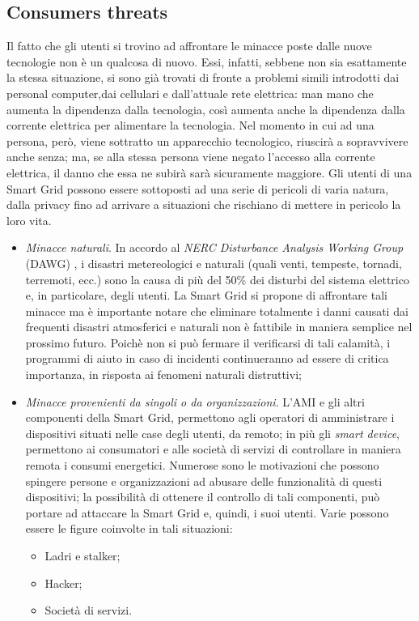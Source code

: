 \subsection{Consumers threats}
Il fatto che gli utenti si trovino ad affrontare le minacce poste dalle nuove tecnologie non è un qualcosa di nuovo. Essi, infatti, sebbene non sia esattamente la stessa situazione, si sono già trovati di fronte a problemi simili introdotti dai personal computer,dai  cellulari e dall'attuale rete elettrica: man mano che aumenta la dipendenza dalla tecnologia, così aumenta anche la dipendenza dalla corrente elettrica per alimentare la tecnologia. Nel momento in cui ad una persona, però, viene sottratto un apparecchio tecnologico, riuscirà a sopravvivere anche senza; ma, se alla stessa persona viene negato l'accesso alla corrente elettrica, il danno che essa ne subirà sarà sicuramente maggiore.\newline
Gli utenti di una Smart Grid possono essere sottoposti ad una serie di pericoli di varia natura, dalla privacy fino ad arrivare a situazioni che rischiano di mettere in pericolo la loro vita.
\begin{itemize}
\item \textit{Minacce naturali}. In accordo al \textit{NERC Disturbance Analysis Working Group} (DAWG) \cite{securingSG}, i disastri metereologici e naturali (quali venti, tempeste, tornadi, terremoti, ecc.) sono la causa di più del 50\% dei disturbi del sistema elettrico e, in particolare, degli utenti. La Smart Grid si propone di affrontare tali minacce ma è importante notare che eliminare totalmente i danni causati dai frequenti disastri atmosferici e naturali non è fattibile in maniera semplice nel prossimo futuro. Poichè non si può fermare il verificarsi di tali calamità, i programmi di aiuto in caso di incidenti continueranno ad essere di critica importanza, in risposta ai fenomeni naturali distruttivi;
\item \textit{Minacce provenienti da singoli o da organizzazioni}. L'AMI e gli altri componenti della Smart Grid, permettono agli operatori di amministrare i dispositivi situati nelle case degli utenti, da remoto; in più gli \textit{smart device}, permettono ai consumatori e alle società di servizi di controllare in maniera remota i consumi energetici. Numerose sono le motivazioni che possono spingere persone e organizzazioni ad abusare delle funzionalità di questi dispositivi; la possibilità di ottenere il controllo di tali componenti, può portare ad attaccare la Smart Grid e, quindi, i suoi utenti. Varie possono essere le figure coinvolte in tali situazioni:
	\begin{itemize}
	\item Ladri e stalker;
	\item Hacker;
	\item Società di servizi.
	\end{itemize}
\end{itemize}


